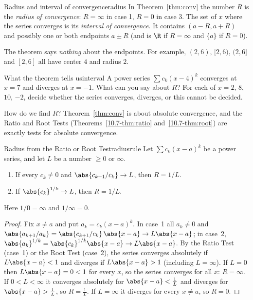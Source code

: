 \documentclass[11pt]{article}
\begin{document}
\begin{defn}{Radius and interval of convergence}{radius}
In Theorem~\ref{thm:conv} the number $R$ is the \emph{radius of convergence}: $R=\infty$ in case 1, $R=0$ in case 3. The set of $x$ where the series converges is its \emph{interval of convergence}. It contains $(a-R,a+R)$ and possibly one or both endpoints $a\pm R$ (and is $\R$ if $R=\infty$ and $\{a\}$ if $R=0$).
\end{defn}

The theorem says \emph{nothing} about the endpoints. For example, $(2,6)$, $[2,6)$, $(2,6]$ and $[2,6]$ all have center $4$ and radius $2$.

\begin{kc}{What the theorem tells us}{interval}
A power series $\sum c_k(x-4)^k$ converges at $x=7$ and diverges at $x=-1$. What can you say about $R$? For each of $x=2$, $8$, $10$, $-2$, decide whether the series converges, diverges, or this cannot be decided.
\end{kc}

How do we find $R$? Theorem~\ref{thm:conv} is about absolute convergence, and the Ratio and Root Tests (Theorems~\ref{10.7-thm:ratio} and~\ref{10.7-thm:root}) are exactly tests for absolute convergence.

\begin{thm}{Radius from the Ratio or Root Test}{radiusrule}
Let $\sum c_k(x-a)^k$ be a power series, and let $L$ be a number $\ge0$ or $\infty$.
\begin{enumerate}
  \item If every $c_k\ne0$ and $\abs{c_{k+1}/c_k}\to L$, then $R=1/L$.
  \item If $\abs{c_k}^{1/k}\to L$, then $R=1/L$.
\end{enumerate}
Here $1/0=\infty$ and $1/\infty=0$.
\end{thm}
\begin{proof}
Fix $x\ne a$ and put $a_k=c_k(x-a)^k$. In case~1 all $a_k\ne0$ and $\abs{a_{k+1}/a_k}=\abs{c_{k+1}/c_k}\,\abs{x-a}\to L\abs{x-a}$; in case~2, $\abs{a_k}^{1/k}=\abs{c_k}^{1/k}\abs{x-a}\to L\abs{x-a}$. By the Ratio Test (case~1) or the Root Test (case~2), the series converges absolutely if $L\abs{x-a}<1$ and diverges if $L\abs{x-a}>1$ (including $L=\infty$). If $L=0$ then $L\abs{x-a}=0<1$ for every $x$, so the series converges for all $x$: $R=\infty$. If $0<L<\infty$ it converges absolutely for $\abs{x-a}<\frac1L$ and diverges for $\abs{x-a}>\frac1L$, so $R=\frac1L$. If $L=\infty$ it diverges for every $x\ne a$, so $R=0$.
\end{proof}
\end{document}
